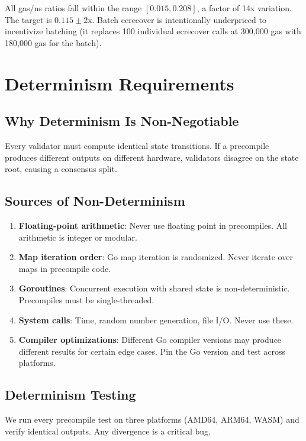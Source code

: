 \documentclass[11pt,a4paper]{article}
\begin{document}
All gas/ns ratios fall within the range $[0.015, 0.208]$, a factor of 14x variation.
The target is $0.115 \pm 2\text{x}$. Batch ecrecover is intentionally underpriced to
incentivize batching (it replaces 100 individual ecrecover calls at 300,000 gas with
180,000 gas for the batch).

\section{Determinism Requirements}

\subsection{Why Determinism Is Non-Negotiable}

Every validator must compute identical state transitions. If a precompile produces
different outputs on different hardware, validators disagree on the state root, causing
a consensus split.

\subsection{Sources of Non-Determinism}

\begin{enumerate}[nosep]
  \item \textbf{Floating-point arithmetic}: Never use floating point in precompiles.
    All arithmetic is integer or modular.
  \item \textbf{Map iteration order}: Go map iteration is randomized. Never iterate over
    maps in precompile code.
  \item \textbf{Goroutines}: Concurrent execution with shared state is non-deterministic.
    Precompiles must be single-threaded.
  \item \textbf{System calls}: Time, random number generation, file I/O. Never use these.
  \item \textbf{Compiler optimizations}: Different Go compiler versions may produce
    different results for certain edge cases. Pin the Go version and test across platforms.
\end{enumerate}

\subsection{Determinism Testing}

We run every precompile test on three platforms (AMD64, ARM64, WASM) and verify identical
outputs. Any divergence is a critical bug.
\end{document}
